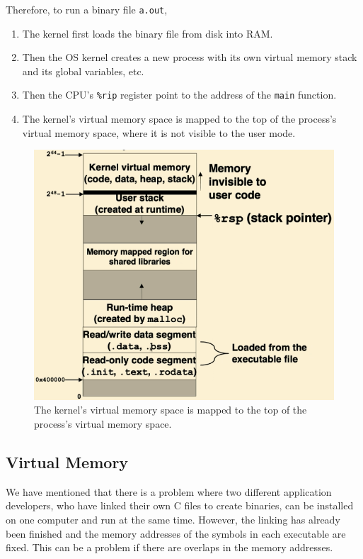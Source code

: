 \documentclass{article}
\begin{document}
    \begin{example}
      Therefore, to run a binary file \texttt{a.out}, 
      \begin{enumerate}
        \item The kernel first loads the binary file from disk into RAM.
        \item Then the OS kernel creates a new process with its own virtual memory stack and its global variables, etc. 
        \item Then the CPU's \texttt{\%rip} register point to the address of the \texttt{main} function. 
        \item The kernel's virtual memory space is mapped to the top of the process's virtual memory space, where it is not visible to the user mode. 
      \end{enumerate}
      \begin{figure}[H]
        \centering 
        \includegraphics[scale=0.4]{img/process_space.png}
        \caption{The kernel's virtual memory space is mapped to the top of the process's virtual memory space.} 
        \label{fig:process_space}
      \end{figure}
    \end{example}

  \subsection{Virtual Memory}

    We have mentioned that there is a problem where two different application developers, who have linked their own C files to create binaries, can be installed on one computer and run at the same time. However, the linking has already been finished and the memory addresses of the symbols in each executable are fixed. This can be a problem if there are overlaps in the memory addresses. 
\end{document}
